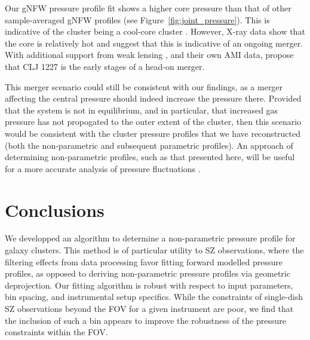 \documentclass[twocolumn,traditabstract]{aa}
\begin{document}
Our gNFW pressure profile fit shows a higher core pressure than that of other sample-averaged gNFW profiles
(see Figure~\ref{fig:joint_pressure}). This is indicative of the cluster being a cool-core cluster .
However, X-ray data \citep[e.g.][]{maughan2007} show that the core is relatively hot and suggest that this is indicative
of an ongoing merger. With additional support from weak lensing \citep{jee2009a}, and their own AMI data, \citet{rumsey2016}
propose that CLJ 1227 is the early stages of a head-on merger.

This merger scenario could still be consistent with our findings, as a merger affecting the central pressure should indeed
increase the pressure there. Provided that the system is not in equilibrium, and in particular, that increased gas pressure
has not propogated to the outer extent of the cluster, then this scenario would be consistent with the cluster pressure profiles
that we have reconstructed (both the non-parametric and subsequent parametric profiles). An approach of determining non-parametric
profiles, such as that presented here, will be useful for a more accurate analysis of pressure fluctuations \citep[e.g.][]{khatri2016}.




\section{Conclusions}
\label{sec:conclusions}

We developped an algorithm to determine a non-parametric pressure profile for galaxy clusters.
This method is of particular utility to SZ observations, where the filtering effects from data
processing favor fitting forward modelled pressure profiles, as opposed to deriving non-parametric pressure profiles via
geometric deprojection. Our fitting algorithm is robust with respect to input parameters,
bin spacing, and instrumental setup specifics. While the constraints of single-dish SZ observations
beyond the FOV for a given instrument are poor, we find that the inclusion of such a bin
appears to improve the robustness of the pressure constraints within the FOV.
\end{document}

